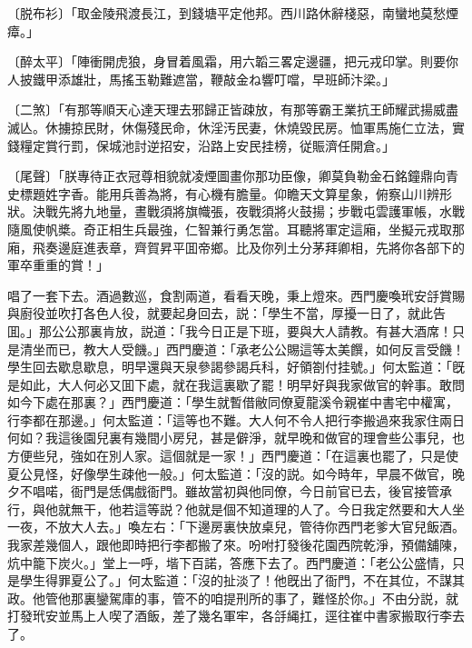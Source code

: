 \begin{myquote}
{\markfont〔脱布衫〕}「取金陵飛渡長江，到錢塘平定他邦。西川路休辭棧惡，南蠻地莫愁煙瘴。」

{\markfont〔醉太平〕}「陣衝開虎狼，身冒着風霜，用六韜三畧定邊疆，把元戎印掌。則要你人披鐵甲添雄壯，馬搖玉勒難遮當，鞭敲金ね響叮噹，早班師汴梁。」　

{\markfont〔二煞〕}「有那等順天心達天理去邪歸正皆疎放，有那等霸王業抗王師耀武揚威盡滅亾。休擄掠民財，休傷殘民命，休淫汚民妻，休燒毀民房。恤軍馬施仁立法，實錢糧定賞行罰，保城池討逆招安，沿路上安民挂榜，従賑濟任開倉。」

{\markfont〔尾聲〕}「朕專待正衣冠尊相貌就凌煙圖畫你那功臣像，卿莫負勒金石銘鐘鼎向青史標題姓字香。能用兵善為將，有心機有膽量。仰瞻天文算星象，俯察山川辨形狀。決戰先將九地量，晝戰須將旗幟張，夜戰須將火鼓揚；步戰屯雲護軍帳，水戰隨風使帆槳。奇正相生兵最強，仁智兼行勇怎當。耳聽將軍定這廂，坐擬元戎取那廂，飛奏邊庭進表章，齊賀昇平囬帝鄉。比及你列土分茅拜卿相，先將你各部下的軍卒重重的賞！」
\end{myquote}

唱了一套下去。酒過數巡，食割兩道，看看天晚，秉上燈來。西門慶喚玳安㧱賞賜與廚役並吹打各色人役，就要起身回去，説：「學生不當，厚擾一日了，就此告囬。」那公公那裏肯放，説道：「我今日正是下班，要與大人請教。有甚大酒席！只是清坐而已，教大人受饑。」西門慶道：「承老公公賜這等太美饌，如何反言受饑！學生回去歇息歇息，明早還與天泉參謁參謁兵科，好領劄付挂號。」何太監道：「旣是如此，大人何必又囬下處，就在我這裏歇了罷！明早好與我家做官的幹事。敢問如今下處在那裏？」西門慶道：「學生就暫借敝同僚夏龍溪令親崔中書宅中權寓，行李都在那邊。」何太監道：「這等也不難。大人何不令人把行李搬過來我家住兩日何如？我這後園兒裏有幾間小房兒，甚是僻淨，就早晚和做官的理會些公事兒，也方便些兒，強如在別人家。這個就是一家！」西門慶道：「在這裏也罷了，只是使夏公見怪，好像學生疎他一般。」何太監道：「沒的説。如今時年，早晨不做官，晚夕不唱喏，衙門是恁偶戲衙門。雖故當初與他同僚，今日前官已去，後官接管承行，與他就無干，他若這等説？他就是個不知道理的人了。今日我定然要和大人坐一夜，不放大人去。」喚左右：「下邊房裏快放桌兒，管待你西門老爹大官兒飯酒。我家差幾個人，跟他即時把行李都搬了來。吩咐打發後花園西院乾淨，預備舖陳，炕中籠下炭火。」堂上一呼，堦下百諾，答應下去了。西門慶道：「老公公盛情，只是學生得罪夏公了。」何太監道：「沒的扯淡了！他旣出了衙門，不在其位，不謀其政。他管他那裏鑾駕庫的事，管不的咱提刑所的事了，難怪於你。」不由分説，就打發玳安並馬上人喫了酒飯，差了幾名軍牢，各㧱䋲扛，逕往崔中書家搬取行李去了。

